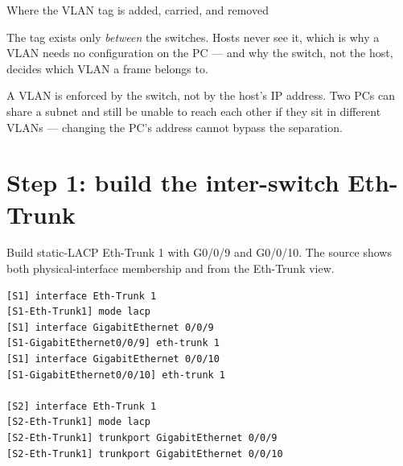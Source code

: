 \begin{netfigure}{Where the VLAN tag is added, carried, and removed}

\smallskip
{\scriptsize The tag exists only \emph{between} the switches. Hosts never see it,
which is why a VLAN needs no configuration on the PC --- and why the switch,
not the host, decides which VLAN a frame belongs to.}
\end{netfigure}

\begin{keyidea}
A VLAN is enforced by the switch, not by the host's IP address. Two PCs can share a subnet and still be unable to reach each other if they sit in different VLANs --- changing the PC's address cannot bypass the separation.
\end{keyidea}

\section{Step 1: build the inter-switch Eth-Trunk}
Build static-LACP Eth-Trunk 1 with G0/0/9 and G0/0/10. The source shows both physical-interface membership and  from the Eth-Trunk view.
\begin{lstlisting}[style=dcnterminal]
[S1] interface Eth-Trunk 1
[S1-Eth-Trunk1] mode lacp
[S1] interface GigabitEthernet 0/0/9
[S1-GigabitEthernet0/0/9] eth-trunk 1
[S1] interface GigabitEthernet 0/0/10
[S1-GigabitEthernet0/0/10] eth-trunk 1

[S2] interface Eth-Trunk 1
[S2-Eth-Trunk1] mode lacp
[S2-Eth-Trunk1] trunkport GigabitEthernet 0/0/9
[S2-Eth-Trunk1] trunkport GigabitEthernet 0/0/10
\end{lstlisting}

